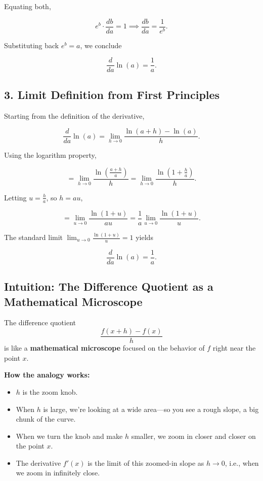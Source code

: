 \documentclass[10pt,twocolumn]{article}
\begin{document}
Equating both,

\[
e^b \cdot \frac{db}{da} = 1 \implies \frac{db}{da} = \frac{1}{e^b}.
\]

Substituting back \(e^b = a\), we conclude

\[
\frac{d}{da} \ln(a) = \frac{1}{a}.
\]

\subsection*{3. Limit Definition from First Principles}

Starting from the definition of the derivative,

\[
\frac{d}{da} \ln(a) = \lim_{h \to 0} \frac{\ln(a + h) - \ln(a)}{h}.
\]

Using the logarithm property,

\[
= \lim_{h \to 0} \frac{\ln\left(\frac{a+h}{a}\right)}{h} = \lim_{h \to 0} \frac{\ln\left(1 + \frac{h}{a}\right)}{h}.
\]

Letting \(u = \frac{h}{a}\), so \(h = a u\),

\[
= \lim_{u \to 0} \frac{\ln(1 + u)}{a u} = \frac{1}{a} \lim_{u \to 0} \frac{\ln(1 + u)}{u}.
\]

The standard limit \(\lim_{u \to 0} \frac{\ln(1 + u)}{u} = 1\) yields

\[
\frac{d}{da} \ln(a) = \frac{1}{a}.
\]

\subsection*{Intuition: The Difference Quotient as a Mathematical Microscope}

The difference quotient
\[
\frac{f(x+h) - f(x)}{h}
\]
is like a \textbf{mathematical microscope} focused on the behavior of \(f\) right near the point \(x\).

\medskip

\textbf{How the analogy works:}

\begin{itemize}
  \item \(h\) is the zoom knob.
  \item When \(h\) is large, we’re looking at a wide area—so you see a rough slope, a big chunk of the curve.
  \item When we turn the knob and make \(h\) smaller, we zoom in closer and closer on the point \(x\).
  \item The derivative \(f'(x)\) is the limit of this zoomed-in slope as \(h \to 0\), i.e., when we zoom in infinitely close.
\end{itemize}
\end{document}
